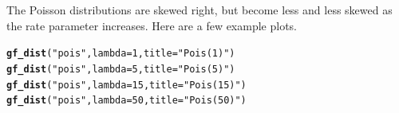 \documentclass[twoside]{book}\usepackage[]{graphicx}\usepackage[]{xcolor}
\makeatletter
\newcommand{\hlnum}[1]{\textcolor[rgb]{0.686,0.059,0.569}{#1}}%
\newcommand{\hlstr}[1]{\textcolor[rgb]{0.192,0.494,0.8}{#1}}%
\newcommand{\hlstd}[1]{\textcolor[rgb]{0.345,0.345,0.345}{#1}}%
\newcommand{\hlkwc}[1]{\textcolor[rgb]{0.333,0.667,0.333}{#1}}%
\newcommand{\hlkwd}[1]{\textcolor[rgb]{0.737,0.353,0.396}{\textbf{#1}}}%
\newenvironment{kframe}{%
 \def\at@end@of@kframe{}%
 \ifinner\ifhmode%
  \def\at@end@of@kframe{\end{minipage}}%
  \begin{minipage}{\columnwidth}%
 \fi\fi%
 \def\FrameCommand##1{\hskip\@totalleftmargin \hskip-\fboxsep
 \colorbox{shadecolor}{##1}\hskip-\fboxsep
     \hskip-\linewidth \hskip-\@totalleftmargin \hskip\columnwidth}%
 \MakeFramed {\advance\hsize-\width
   \@totalleftmargin\z@ \linewidth\hsize
   \@setminipage}}%
 {\par\unskip\endMakeFramed%
 \at@end@of@kframe}
\newenvironment{knitrout}{}{} %
\newcounter{example}[section]
\makeatother
\begin{document}
The Poisson distributions are skewed right, but become less and less skewed as 
the rate parameter increases.  Here are a few example plots.
\begin{knitrout}
\color{fgcolor}\begin{kframe}
\begin{alltt}
\hlkwd{gf_dist}\hlstd{(}\hlstr{"pois"}\hlstd{,} \hlkwc{lambda} \hlstd{=} \hlnum{1}\hlstd{,} \hlkwc{title} \hlstd{=} \hlstr{"Pois(1)"}\hlstd{)}
\hlkwd{gf_dist}\hlstd{(}\hlstr{"pois"}\hlstd{,} \hlkwc{lambda} \hlstd{=} \hlnum{5}\hlstd{,} \hlkwc{title} \hlstd{=} \hlstr{"Pois(5)"}\hlstd{)}
\hlkwd{gf_dist}\hlstd{(}\hlstr{"pois"}\hlstd{,} \hlkwc{lambda} \hlstd{=} \hlnum{15}\hlstd{,} \hlkwc{title} \hlstd{=} \hlstr{"Pois(15)"}\hlstd{)}
\hlkwd{gf_dist}\hlstd{(}\hlstr{"pois"}\hlstd{,} \hlkwc{lambda} \hlstd{=} \hlnum{50}\hlstd{,} \hlkwc{title} \hlstd{=} \hlstr{"Pois(50)"}\hlstd{)}
\end{alltt}
\end{kframe}


\end{knitrout}
\end{document}
